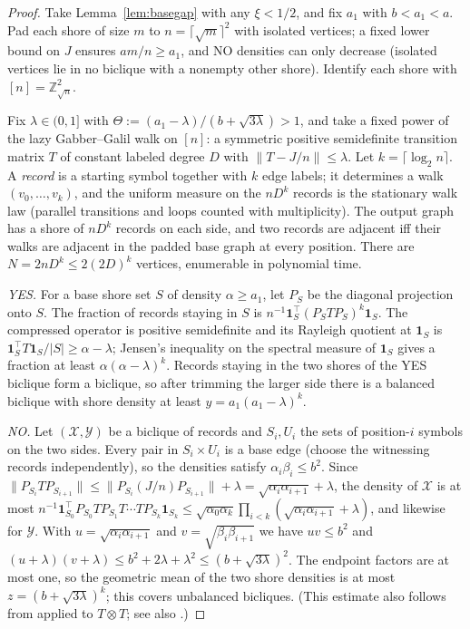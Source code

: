 \documentclass[11pt,letterpaper]{article}
\theoremstyle{definition}
\theoremstyle{remark}
\newcommand{\Z}{\mathbb Z}
\newcommand{\ind}{\mathbf 1}
\begin{document}
\begin{proof}
Take Lemma~\ref{lem:basegap} with any \(\xi<1/2\), and fix \(a_1\) with
\(b<a_1<a\). Pad each shore of size \(m\) to \(n=\lceil\sqrt m\rceil^2\)
with isolated vertices; a fixed lower bound on \(J\) ensures \(am/n\ge
a_1\), and NO densities can only decrease (isolated vertices lie in no
biclique with a nonempty other shore). Identify each shore with
\([n]=\Z_{\sqrt n}^2\).

Fix \(\lambda\in(0,1]\) with \(\Theta:=(a_1-\lambda)/(b+\sqrt{3\lambda})>1\),
and take a fixed power of the lazy Gabber--Galil walk \cite{gg81} on \([n]\):
a symmetric positive semidefinite transition matrix \(T\) of constant labeled
degree \(D\) with \(\|T-J/n\|\le\lambda\). Let \(k=\lceil\log_2n\rceil\). A
\emph{record} is a starting symbol together with \(k\) edge labels; it
determines a walk \((v_0,\dots,v_k)\), and the uniform measure on the
\(nD^k\) records is the stationary walk law (parallel transitions and loops
counted with multiplicity). The output graph has a shore of \(nD^k\) records
on each side, and two records are adjacent iff their walks are adjacent in
the padded base graph at every position. There are \(N=2nD^k\le2(2D)^k\)
vertices, enumerable in polynomial time.

\emph{YES.} For a base shore set \(S\) of density \(\alpha\ge a_1\), let
\(P_S\) be the diagonal projection onto \(S\). The fraction of records
staying in \(S\) is \(n^{-1}\ind_S^{\top}(P_STP_S)^k\ind_S\). The compressed
operator is positive semidefinite and its Rayleigh quotient at \(\ind_S\) is
\(\ind_S^{\top}T\ind_S/|S|\ge\alpha-\lambda\); Jensen's inequality on the
spectral measure of \(\ind_S\) gives a fraction at least
\(\alpha(\alpha-\lambda)^k\). Records staying in the two shores of the YES
biclique form a biclique, so after trimming the larger side there is a
balanced biclique with shore density at least \(y=a_1(a_1-\lambda)^k\).

\emph{NO.} Let \((\mathcal X,\mathcal Y)\) be a biclique of records and
\(S_i,U_i\) the sets of position-\(i\) symbols on the two sides. Every pair in
\(S_i\times U_i\) is a base edge (choose the witnessing records
independently), so the densities satisfy \(\alpha_i\beta_i\le b^2\). Since
\(\|P_{S_i}TP_{S_{i+1}}\|\le\|P_{S_i}(J/n)P_{S_{i+1}}\|+\lambda=
\sqrt{\alpha_i\alpha_{i+1}}+\lambda\), the density of \(\mathcal X\) is at most
\(n^{-1}\ind_{S_0}^{\top}P_{S_0}TP_{S_1}T\cdots TP_{S_k}\ind_{S_k}\le
\sqrt{\alpha_0\alpha_k}\prod_{i<k}(\sqrt{\alpha_i\alpha_{i+1}}+\lambda)\), and
likewise for \(\mathcal Y\). With \(u=\sqrt{\alpha_i\alpha_{i+1}}\) and
\(v=\sqrt{\beta_i\beta_{i+1}}\) we have \(uv\le b^2\) and
\((u+\lambda)(v+\lambda)\le b^2+2\lambda+\lambda^2\le(b+\sqrt{3\lambda})^2\).
The endpoint factors are at most one, so the geometric mean of the two shore
densities is at most \(z=(b+\sqrt{3\lambda})^k\); this covers unbalanced
bicliques. (This estimate also follows from \cite[Proposition~22]{tz24}
applied to \(T\otimes T\); see also \cite[Section~4]{gl04}.)


\end{proof}
\end{document}
